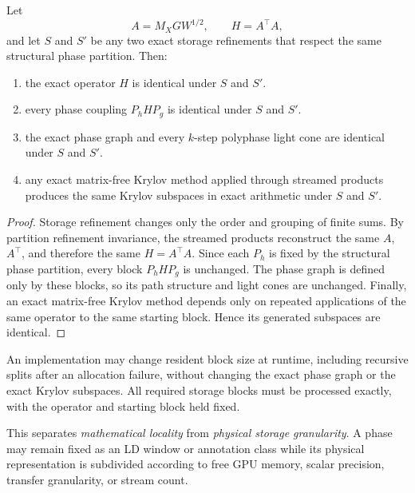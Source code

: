 \begin{theorem}\label{claim:final-29-1}
Let
\[
A=M_XGW^{1/2},
\qquad H=A^\top A,
\]
and let $S$ and $S'$ be any two exact storage refinements that respect the
same structural phase partition.  Then:
\begin{enumerate}[label=(\roman*)]
\item the exact operator $H$ is identical under $S$ and $S'$.
\item every phase coupling $P_hHP_g$ is identical under $S$ and $S'$.
\item the exact phase graph and every $k$-step polyphase light cone are
identical under $S$ and $S'$.
\item any exact matrix-free Krylov method applied through streamed products
produces the same Krylov subspaces in exact arithmetic under $S$ and $S'$.
\end{enumerate}
\end{theorem}

\begin{proof}
Storage refinement changes only the order and grouping of finite sums.
By partition refinement invariance, the streamed products reconstruct the
same $A$, $A^\top$, and therefore the same $H=A^\top A$.  Since each
$P_h$ is fixed by the structural phase partition, every block
$P_hHP_g$ is unchanged.  The phase graph is defined only by these blocks, so
its path structure and light cones are unchanged.  Finally, an exact
matrix-free Krylov method depends only on repeated applications of the same
operator to the same starting block. Hence its generated subspaces are
identical.
\end{proof}

\begin{corollary}\label{claim:final-29-2}
An implementation may change resident block size at runtime, including
recursive splits after an allocation failure, without changing the exact
phase graph or the exact Krylov subspaces. All required storage blocks must
be processed exactly, with the operator and starting block held fixed.
\end{corollary}

This separates \emph{mathematical locality} from \emph{physical storage
granularity}.  A phase may remain fixed as an LD window or annotation class
while its physical representation is subdivided according to free GPU
memory, scalar precision, transfer granularity, or stream count.

